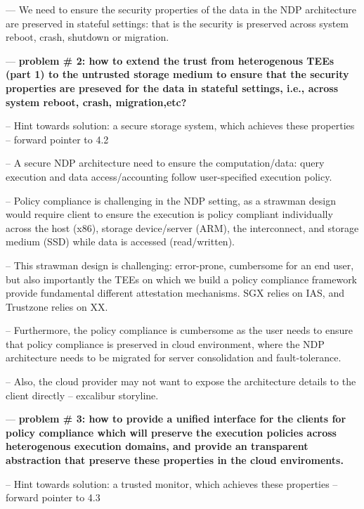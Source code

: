 --- We need to ensure the security properties of the data in the NDP architecture are preserved in stateful settings: that is the security is preserved across system reboot, crash, shutdown or migration. 

--- {\bf problem \# 2: how to extend the trust from heterogenous TEEs (part 1) to the untrusted storage medium to ensure that the security properties are preseved for the data in stateful settings, i.e., across system reboot, crash, migration,etc? }

-- Hint towards solution: a secure storage system, which achieves these properties -- forward pointer to 4.2




-- A secure NDP architecture need to ensure the computation/data: query execution and data access/accounting follow user-specified execution policy.

-- Policy compliance is challenging in the NDP setting, as a strawman design would require client to ensure the execution is policy compliant individually across the host (x86), storage device/server (ARM), the interconnect, and storage medium (SSD) while data is accessed (read/written). 

-- This strawman design is challenging: error-prone, cumbersome for an end user, but also importantly the TEEs on which we build a policy compliance framework provide fundamental different attestation mechanisms. SGX relies on IAS, and Trustzone relies on XX.

-- Furthermore, the policy compliance is cumbersome as the user needs to ensure that policy compliance is preserved in cloud environment, where the NDP architecture needs to be migrated for server consolidation and fault-tolerance. 

-- Also, the cloud provider may not want to expose the architecture details to the client directly -- excalibur storyline.

--- {\bf problem \# 3: how to provide a unified interface for the clients for policy compliance which will preserve the execution policies across heterogenous execution domains, and provide an transparent abstraction that preserve these properties in the cloud enviroments.}


-- Hint towards solution: a trusted  monitor, which achieves these properties -- forward pointer to 4.3

\fi


